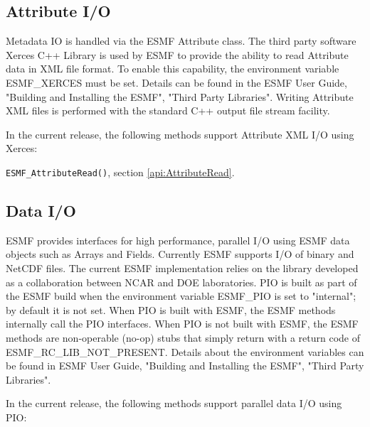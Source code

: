 \subsection{Attribute I/O}
\label{io:attributeio}

Metadata IO is handled via the ESMF Attribute class. The third
party software Xerces C++ Library is used by ESMF to provide
the ability to read Attribute data in XML file format.
To enable this capability, the environment variable ESMF\_XERCES must be
set. Details can be found in the ESMF User Guide, "Building and Installing the ESMF", "Third Party Libraries".  Writing Attribute XML files is performed with 
the standard C++ output file stream facility.

In the current release, the following methods support Attribute XML I/O using Xerces:

\begin{description}
\item {\tt ESMF\_AttributeRead()}, section \ref{api:AttributeRead}.
\end{description}


\subsection{Data I/O}
\label{io:dataio}

\begin{sloppypar}
ESMF provides interfaces for high performance, parallel I/O using ESMF data
objects such as Arrays and Fields.  Currently ESMF supports I/O of binary and
NetCDF files.  The current ESMF implementation relies on the 
 library developed as a collaboration between NCAR and DOE 
laboratories.  PIO is built as part of the ESMF build when the environment 
variable ESMF\_PIO is set to "internal"; by default it is not set.
When PIO is built with ESMF, the ESMF methods internally call the PIO 
interfaces.  When PIO is not built with ESMF, the ESMF methods are 
non-operable (no-op) stubs that simply return with a return code of
ESMF\_RC\_LIB\_NOT\_PRESENT.  Details about the environment variables can be 
found in ESMF User Guide, "Building and Installing the ESMF", 
"Third Party Libraries".
\end{sloppypar}

In the current release, the following methods support parallel data I/O using PIO:

